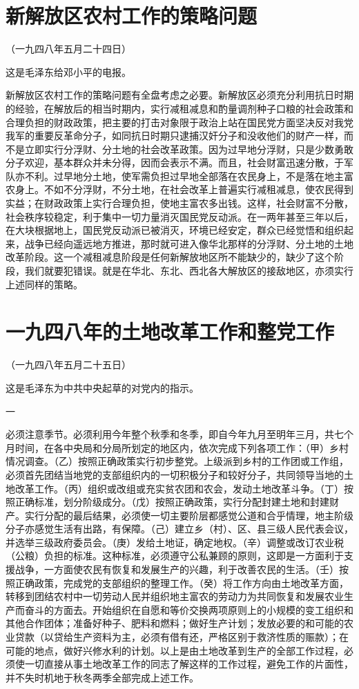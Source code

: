 \documentclass[UTF-8, a5paper, 12pt]{ctexart}
\begin{document}
\section{新解放区农村工作的策略问题}

（一九四八年五月二十四日）

这是毛泽东给邓小平的电报。

新解放区农村工作的策略问题有全盘考虑之必要。新解放区必须充分利用抗日时期的经验，在解放后的相当时期内，实行减租减息和酌量调剂种子口粮的社会政策和合理负担的财政政策，把主要的打击对象限于政治上站在国民党方面坚决反对我党我军的重要反革命分子，如同抗日时期只逮捕汉奸分子和没收他们的财产一样，而不是立即实行分浮财、分土地的社会改革政策。因为过早地分浮财，只是少数勇敢分子欢迎，基本群众并未分得，因而会表示不满。而且，社会财富迅速分散，于军队亦不利。过早地分土地，使军需负担过早地全部落在农民身上，不是落在地主富农身上。不如不分浮财，不分土地，在社会改革上普遍实行减租减息，使农民得到实益；在财政政策上实行合理负担，使地主富农多出钱。这样，社会财富不分散，社会秩序较稳定，利于集中一切力量消灭国民党反动派。在一两年甚至三年以后，在大块根据地上，国民党反动派已被消灭，环境已经安定，群众已经觉悟和组织起来，战争已经向遥远地方推进，那时就可进入像华北那样的分浮财、分土地的土地改革阶段。这一个减租减息阶段是任何新解放地区所不能缺少的，缺少了这个阶段，我们就要犯错误。就是在华北、东北、西北各大解放区的接敌地区，亦须实行上述同样的策略。 

\section{一九四八年的土地改革工作和整党工作}

（一九四八年五月二十五日）

这是毛泽东为中共中央起草的对党内的指示。

一

必须注意季节。必须利用今年整个秋季和冬季，即自今年九月至明年三月，共七个月时间，在各中央局和分局所划定的地区内，依次完成下列各项工作：（甲）乡村情况调查。（乙）按照正确政策实行初步整党。上级派到乡村的工作团或工作组，必须首先团结当地党的支部组织内的一切积极分子和较好分子，共同领导当地的土地改革工作。（丙）组织或改组或充实贫农团和农会，发动土地改革斗争。（丁）按照正确标准，划分阶级成分。（戊）按照正确政策，实行分配封建土地和封建财产。实行分配的最后结果，必须使一切主要阶层都感觉公道和合乎情理，地主阶级分子亦感觉生活有出路，有保障。（己）建立乡（村）、区、县三级人民代表会议，并选举三级政府委员会。（庚）发给土地证，确定地权。（辛）调整或改订农业税（公粮）负担的标准。这种标准，必须遵守公私兼顾的原则，这即是一方面利于支援战争，一方面使农民有恢复和发展生产的兴趣，利于改善农民的生活。（壬）按照正确政策，完成党的支部组织的整理工作。（癸）将工作方向由土地改革方面，转移到团结农村中一切劳动人民并组织地主富农的劳动力为共同恢复和发展农业生产而奋斗的方面去。开始组织在自愿和等价交换两项原则上的小规模的变工组织和其他合作团体；准备好种子、肥料和燃料；做好生产计划；发放必要的和可能的农业贷款（以贷给生产资料为主，必须有借有还，严格区别于救济性质的赈款）；在可能的地点，做好兴修水利的计划。以上是由土地改革到生产的全部工作过程，必须使一切直接从事土地改革工作的同志了解这样的工作过程，避免工作的片面性，并不失时机地于秋冬两季全部完成上述工作。
\end{document}

